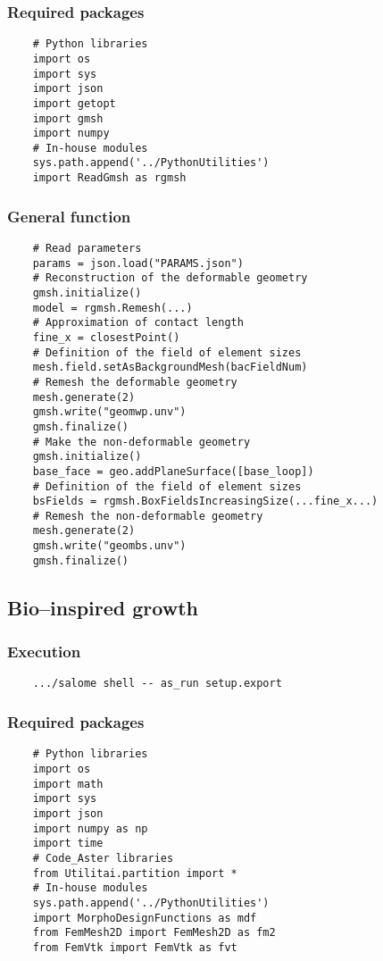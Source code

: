 \documentclass{article}
\begin{document}
\subsubsection{Required packages}
\begin{verbatim}
    # Python libraries
    import os
    import sys
    import json
    import getopt
    import gmsh
    import numpy
    # In-house modules
    sys.path.append('../PythonUtilities')
    import ReadGmsh as rgmsh
\end{verbatim}
\subsubsection{General function}
\begin{verbatim}
    # Read parameters
    params = json.load("PARAMS.json")
    # Reconstruction of the deformable geometry
    gmsh.initialize()
    model = rgmsh.Remesh(...)
    # Approximation of contact length
    fine_x = closestPoint()
    # Definition of the field of element sizes
    mesh.field.setAsBackgroundMesh(bacFieldNum)
    # Remesh the deformable geometry
    mesh.generate(2)
    gmsh.write("geomwp.unv")
    gmsh.finalize()
    # Make the non-deformable geometry
    gmsh.initialize()
    base_face = geo.addPlaneSurface([base_loop])
    # Definition of the field of element sizes
    bsFields = rgmsh.BoxFieldsIncreasingSize(...fine_x...)
    # Remesh the non-deformable geometry
    mesh.generate(2)
    gmsh.write("geombs.unv")
    gmsh.finalize()
\end{verbatim}

\subsection{Bio--inspired growth}
\subsubsection{Execution}
\begin{verbatim}
    .../salome shell -- as_run setup.export
\end{verbatim}
\subsubsection{Required packages}
\begin{verbatim}
    # Python libraries
    import os
    import math
    import sys
    import json
    import numpy as np
    import time
    # Code_Aster libraries
    from Utilitai.partition import *
    # In-house modules
    sys.path.append('../PythonUtilities')
    import MorphoDesignFunctions as mdf
    from FemMesh2D import FemMesh2D as fm2
    from FemVtk import FemVtk as fvt
\end{verbatim}
\end{document}
